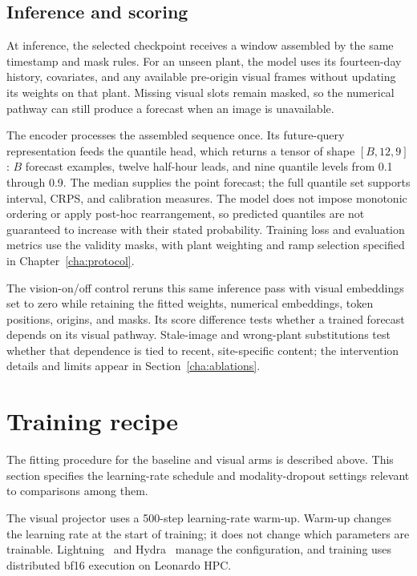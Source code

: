 \subsection{Inference and scoring}

At inference, the selected checkpoint receives a window assembled by the same timestamp and mask rules. For an unseen plant, the model uses its fourteen-day history, covariates, and any available pre-origin visual frames without updating its weights on that plant. Missing visual slots remain masked, so the numerical pathway can still produce a forecast when an image is unavailable.

The encoder processes the assembled sequence once. Its future-query representation feeds the quantile head, which returns a tensor of shape $[B,12,9]$: $B$ forecast examples, twelve half-hour leads, and nine quantile levels from 0.1 through 0.9. The median supplies the point forecast; the full quantile set supports interval, CRPS, and calibration measures. The model does not impose monotonic ordering or apply post-hoc rearrangement, so predicted quantiles are not guaranteed to increase with their stated probability. Training loss and evaluation metrics use the validity masks, with plant weighting and ramp selection specified in Chapter~\ref{cha:protocol}.

The vision-on/off control reruns this same inference pass with visual embeddings set to zero while retaining the fitted weights, numerical embeddings, token positions, origins, and masks. Its score difference tests whether a trained forecast depends on its visual pathway. Stale-image and wrong-plant substitutions test whether that dependence is tied to recent, site-specific content; the intervention details and limits appear in Section~\ref{cha:ablations}.

\section{Training recipe}
\label{sec:training-recipe}

The fitting procedure for the baseline and visual arms is described above. This section specifies the learning-rate schedule and modality-dropout settings relevant to comparisons among them.

The visual projector uses a 500-step learning-rate warm-up. Warm-up changes the learning rate at the start of training; it does not change which parameters are trainable. Lightning~\cite{lightning} and Hydra~\cite{hydra} manage the configuration, and training uses distributed bf16 execution on Leonardo HPC.

